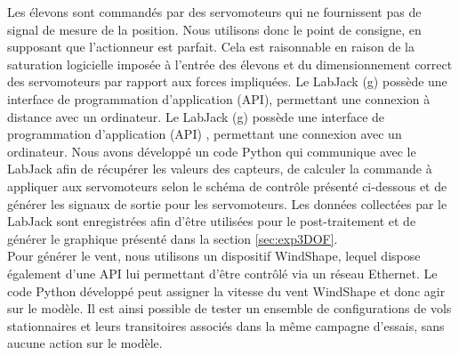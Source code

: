 Les élevons sont commandés par des servomoteurs qui ne fournissent pas de signal de mesure de la position. Nous utilisons donc le point de consigne, en supposant que l'actionneur est parfait. Cela est raisonnable en raison de la saturation logicielle imposée à l'entrée des élevons et du dimensionnement correct des servomoteurs par rapport aux forces impliquées. Le LabJack (g) possède une interface de programmation d'application (API), permettant une connexion à distance avec un ordinateur.
Le LabJack (g) possède une interface de programmation d'application (API) , permettant une connexion avec un ordinateur. Nous avons développé un code Python qui communique avec le LabJack afin de récupérer les valeurs des capteurs, de calculer la commande à appliquer aux servomoteurs selon le schéma de contrôle présenté ci-dessous et de générer les signaux de sortie pour les servomoteurs. Les données collectées par le LabJack sont enregistrées afin d'être utilisées pour le post-traitement et de générer le graphique présenté dans la section \ref{sec:exp3DOF}. \\
Pour générer le vent, nous utilisons un dispositif WindShape, lequel dispose également d'une API lui permettant d'être contrôlé via un réseau Ethernet. Le code Python développé peut assigner la vitesse du vent WindShape et donc agir sur le modèle. Il est ainsi possible de tester un ensemble de configurations de vols stationnaires et leurs transitoires associés dans la même campagne d'essais, sans aucune action sur le modèle. 


